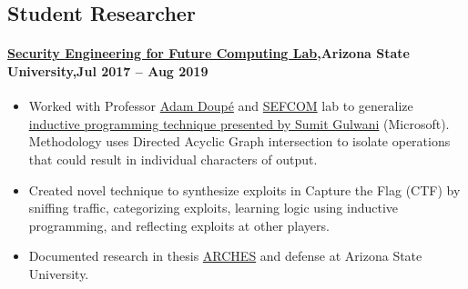 \subsection{Student Researcher}
\paragraph{\href{https://sefcom.asu.edu/}{Security Engineering for Future Computing Lab},Arizona State University,Jul 2017 -- Aug 2019}
\begin{itemize}
    \item Worked with Professor \href{https://adamdoupe.com/}{Adam Doupé} and \href{https://sefcom.asu.edu/}{SEFCOM} lab to generalize \href{https://dl.acm.org/doi/abs/10.1145/1925844.1926423}{inductive programming technique presented by Sumit Gulwani} (Microsoft). Methodology uses Directed Acyclic Graph intersection to isolate operations that could result in individual characters of output.
    \item Created novel technique to synthesize exploits in Capture the Flag (CTF) by sniffing traffic, categorizing exploits, learning logic using inductive programming, and reflecting exploits at other players.
    \item Documented research in thesis \href{https://keep.lib.asu.edu/items/157598}{ARCHES} and defense at Arizona State University.
\end{itemize}